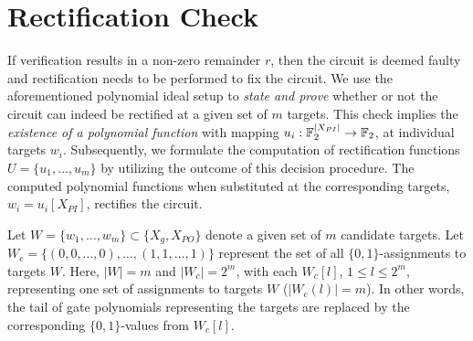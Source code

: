\section{Rectification Check}\label{sec:rcheck}

If verification results in a non-zero remainder $r$, then the circuit is deemed faulty and rectification needs 
to be performed to fix the circuit. 
We use the aforementioned polynomial ideal setup to {\it state and prove}
whether or not the circuit can indeed be rectified at a given set of $m$ targets.
This check implies the {\it existence of a
polynomial function} with mapping $u_i:{\mathbb{F}}_{2}^{|X_{PI}|}\rightarrow {\mathbb{F}}_{2}$, at individual targets $w_i$.
Subsequently, we formulate the computation of rectification functions $U = \{u_1,\dots,u_m\}$ by utilizing
the outcome of this decision procedure. The computed polynomial functions when substituted at the corresponding 
targets, $w_i = u_i[X_{PI}]$, rectifies the circuit.



Let $W = \{w_1,\dots,w_m\} \subset \{X_g,X_{PO}\}$ denote a given set of $m$ candidate targets.
Let $W_c = \{(0,0,\dots,0),\dots,(1,1,\dots,1)\}$ represent the set of all $\{0,1\}$-assignments to targets $W$.
Here, $|W| = m$ and $|W_c| = 2^m$, with each $W_c[l]$, $1 \leq l \leq 2^m$, representing one set of assignments 
to targets $W$ ($|W_c(l)| = m $). In other words, the tail of gate polynomials representing the targets are replaced
by the corresponding $\{0,1\}$-values from $W_c[l]$.

